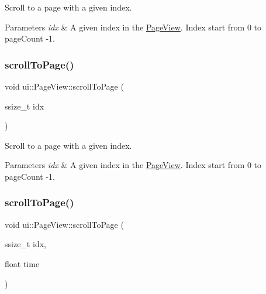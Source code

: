 Scroll to a page with a given index.


\begin{DoxyParams}{Parameters}
{\em idx} & A given index in the \hyperlink{classui_1_1PageView}{Page\+View}. Index start from 0 to page\+Count -\/1. \\
\hline
\end{DoxyParams}
\mbox{\label{classui_1_1PageView_a054f9005201643dfb457965f26bf3625}} 
\subsubsection{\texorpdfstring{scroll\+To\+Page()}{scrollToPage()}\hspace{0.1cm}{\footnotesize\ttfamily [2/3]}}
{\footnotesize\ttfamily void ui\+::\+Page\+View\+::scroll\+To\+Page (\begin{DoxyParamCaption}\item[{ssize\+\_\+t}]{idx }\end{DoxyParamCaption})}

Scroll to a page with a given index.


\begin{DoxyParams}{Parameters}
{\em idx} & A given index in the \hyperlink{classui_1_1PageView}{Page\+View}. Index start from 0 to page\+Count -\/1. \\
\hline
\end{DoxyParams}
\mbox{\label{classui_1_1PageView_a770afe4df47aeda905850dfa1767ad8a}} 
\subsubsection{\texorpdfstring{scroll\+To\+Page()}{scrollToPage()}\hspace{0.1cm}{\footnotesize\ttfamily [3/3]}}
{\footnotesize\ttfamily void ui\+::\+Page\+View\+::scroll\+To\+Page (\begin{DoxyParamCaption}\item[{ssize\+\_\+t}]{idx,  }\item[{float}]{time }\end{DoxyParamCaption})}


